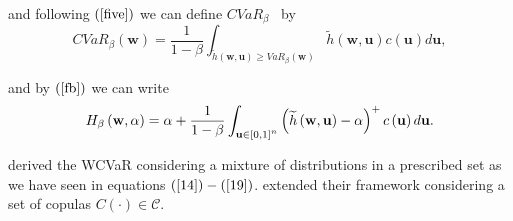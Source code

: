 \documentclass[a4paper,12pt]{report}
\begin{document}
\begin{refsection}
and following $\left( \ref{five}\right) $ we can define $CVaR_{\beta }$%
\thinspace\ by%
\begin{equation}
CVaR_{\beta }\left( \mathbf{w}\right) =\frac{1}{1-\beta }\int_{\widetilde{h}\left(
	\mathbf{w,u}\right) \geq VaR_{\beta }\left( \mathbf{w}\right) }\widetilde{h}\left(
\mathbf{w,u}\right) c\left( \mathbf{u}\right) d\mathbf{u,}  \label{26}
\end{equation}

and by $\left( \ref{fb}\right) $ we can write
\begin{equation}
H_{\beta }\left( \mathbf{w},\alpha \right) =\alpha +\frac{1}{1-\beta }\int_{%
	\mathbf{u} \in \left[ 0,1\right] ^{n}}\left( \widetilde{h}\left( \mathbf{w,u}\right)
-\alpha \right) ^{+}c\left( \mathbf{u}\right) d\mathbf{u.}  \label{27}
\end{equation}

\citet*{zhu2009worst} derived the WCVaR considering a mixture of
distributions in a prescribed set as we have seen in equations $\left( \ref%
{14}\right) -\left( \ref{19}\right) $. \citet*{kakouris14} extended their
framework considering a set of copulas $C\left( \cdot \right) \in \mathcal{C}
$.


\end{refsection}
\end{document}
